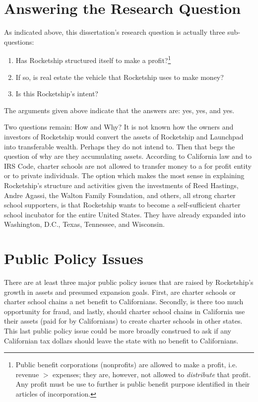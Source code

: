 \section{Answering the Research Question}%
\label{sec:answ-rese-quest}\indent%

As indicated above, this dissertation's research question is actually three sub-questions:
\begin{enumerate}
  \item Has Rocketship structured itself to make a profit?\footnote{Public benefit corporations (nonprofits) are allowed to make a profit, i.e. revenue $>$ expenses; they are, however, not allowed to \textit{distribute} that profit. Any profit must be use to further is public benefit purpose identified in their articles of incorporation.}
  \item If so, is real estate the vehicle that Rocketship uses to make money?
  \item Is this Rocketship's intent?
\end{enumerate}

The arguments given above indicate that the answers are: yes, yes, and yes.

Two questions remain: How and Why? It is not known how the owners and investors of Rocketship would convert the assets of Rocketship and Launchpad into transferable wealth. Perhaps they do not intend to. Then that begs the question of why are they accumulating assets. According to California law and to IRS Code, charter schools are not allowed to transfer money to a for profit entity or to private individuals. The option which makes the most sense in explaining Rocketship's structure and activities given the investments of Reed Hastings, Andre Agassi, the Walton Family Foundation, and others, all strong charter school supporters, is that Rocketship wants to become a self-sufficient charter school incubator for the entire United States.
They have already expanded into Washington, D.C., Texas, Tennessee, and Wisconsin.
\section{Public Policy Issues}%
\label{sec:publ-policy-chang}\indent%

There are at least three major public policy issues that are raised by Rocketship's growth in assets and presumed expansion goals. First, are charter schools or charter school chains a net benefit to Californians. Secondly, is there too much opportunity for fraud, and lastly, should charter school chains in California use their assets (paid for by Californians) to create charter schools in other states. This last public policy issue could be more broadly construed to ask if any Californian tax dollars should leave the state with no benefit to Californians.

